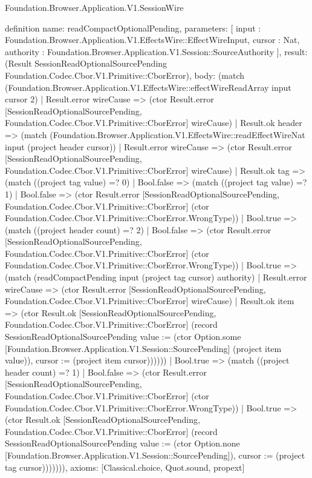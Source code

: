 \begin{lexlean}{Foundation.Browser.Application.V1.SessionWire}
\begin{semanticmodule}
definition{
  name: readCompactOptionalPending,
  parameters: [
    input : Foundation.Browser.Application.V1.EffectsWire::EffectWireInput,
    cursor : Nat,
    authority : Foundation.Browser.Application.V1.Session::SourceAuthority
  ],
  result: (Result SessionReadOptionalSourcePending Foundation.Codec.Cbor.V1.Primitive::CborError),
  body: (match (Foundation.Browser.Application.V1.EffectsWire::effectWireReadArray input cursor 2)
    | Result.error wireCause => (ctor Result.error [SessionReadOptionalSourcePending, Foundation.Codec.Cbor.V1.Primitive::CborError] wireCause)
    | Result.ok header => (match (Foundation.Browser.Application.V1.EffectsWire::readEffectWireNat input (project header cursor))
      | Result.error wireCause => (ctor Result.error [SessionReadOptionalSourcePending, Foundation.Codec.Cbor.V1.Primitive::CborError] wireCause)
      | Result.ok tag => (match ((project tag value) =? 0)
        | Bool.false => (match ((project tag value) =? 1)
          | Bool.false => (ctor Result.error [SessionReadOptionalSourcePending, Foundation.Codec.Cbor.V1.Primitive::CborError] (ctor Foundation.Codec.Cbor.V1.Primitive::CborError.WrongType))
          | Bool.true => (match ((project header count) =? 2)
            | Bool.false => (ctor Result.error [SessionReadOptionalSourcePending, Foundation.Codec.Cbor.V1.Primitive::CborError] (ctor Foundation.Codec.Cbor.V1.Primitive::CborError.WrongType))
            | Bool.true => (match (readCompactPending input (project tag cursor) authority)
              | Result.error wireCause => (ctor Result.error [SessionReadOptionalSourcePending, Foundation.Codec.Cbor.V1.Primitive::CborError] wireCause)
              | Result.ok item => (ctor Result.ok [SessionReadOptionalSourcePending, Foundation.Codec.Cbor.V1.Primitive::CborError] (record SessionReadOptionalSourcePending {value := (ctor Option.some [Foundation.Browser.Application.V1.Session::SourcePending] (project item value)), cursor := (project item cursor)})))))
        | Bool.true => (match ((project header count) =? 1)
          | Bool.false => (ctor Result.error [SessionReadOptionalSourcePending, Foundation.Codec.Cbor.V1.Primitive::CborError] (ctor Foundation.Codec.Cbor.V1.Primitive::CborError.WrongType))
          | Bool.true => (ctor Result.ok [SessionReadOptionalSourcePending, Foundation.Codec.Cbor.V1.Primitive::CborError] (record SessionReadOptionalSourcePending {value := (ctor Option.none [Foundation.Browser.Application.V1.Session::SourcePending]), cursor := (project tag cursor)})))))),
  axioms: [Classical.choice, Quot.sound, propext]
}


\end{semanticmodule}
\end{lexlean}
